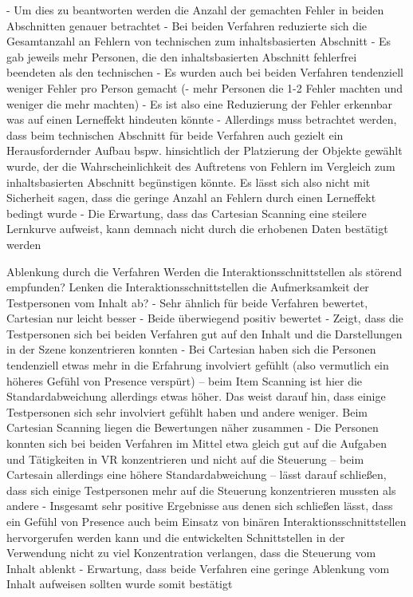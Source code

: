 -	Um dies zu beantworten werden die Anzahl der gemachten Fehler in beiden Abschnitten genauer betrachtet 
-	Bei beiden Verfahren reduzierte sich die Gesamtanzahl an Fehlern von technischen zum inhaltsbasierten Abschnitt 
-	Es gab jeweils mehr Personen, die den inhaltsbasierten Abschnitt fehlerfrei beendeten als den technischen 
-	Es wurden auch bei beiden Verfahren tendenziell weniger Fehler pro Person gemacht (- mehr Personen die 1-2 Fehler machten und weniger die mehr machten)   
-	Es ist also eine Reduzierung der Fehler erkennbar was auf einen Lerneffekt hindeuten könnte 
-	Allerdings muss betrachtet werden, dass beim technischen Abschnitt für beide Verfahren auch gezielt ein Herausfordernder Aufbau bspw. hinsichtlich der Platzierung der Objekte gewählt wurde, der die Wahrscheinlichkeit des Auftretens von Fehlern im Vergleich zum inhaltsbasierten Abschnitt begünstigen könnte. Es lässt sich also nicht mit Sicherheit sagen, dass die geringe Anzahl an Fehlern durch einen Lerneffekt bedingt wurde
-	Die Erwartung, dass das Cartesian Scanning eine steilere Lernkurve aufweist, kann demnach nicht durch die erhobenen Daten bestätigt werden 

Ablenkung durch die Verfahren
Werden die Interaktionsschnittstellen als störend empfunden? Lenken die Interaktionsschnittstellen die Aufmerksamkeit der Testpersonen vom Inhalt ab?
-	Sehr ähnlich für beide Verfahren bewertet, Cartesian nur leicht besser 
-	Beide überwiegend positiv bewertet 
-	Zeigt, dass die Testpersonen sich bei beiden Verfahren gut auf den Inhalt und die Darstellungen in der Szene konzentrieren konnten 
-	Bei Cartesian haben sich die Personen tendenziell etwas mehr in die Erfahrung involviert gefühlt (also vermutlich ein höheres Gefühl von Presence verspürt) – beim Item Scanning ist hier die Standardabweichung allerdings etwas höher. Das weist darauf hin, dass einige Testpersonen sich sehr involviert gefühlt haben und andere weniger. Beim Cartesian Scanning liegen die Bewertungen näher zusammen
-	Die Personen konnten sich bei beiden Verfahren im Mittel etwa gleich gut auf die Aufgaben und Tätigkeiten in VR konzentrieren und nicht auf die Steuerung – beim Cartesain allerdings eine höhere Standardabweichung – lässt darauf schließen, dass sich einige Testpersonen mehr auf die Steuerung konzentrieren mussten als andere 
-	Insgesamt sehr positive Ergebnisse aus denen sich schließen lässt, dass ein Gefühl von Presence auch beim Einsatz von binären Interaktionsschnittstellen hervorgerufen werden kann und die entwickelten Schnittstellen in der Verwendung nicht zu viel Konzentration verlangen, dass die Steuerung vom Inhalt ablenkt 
-	Erwartung, dass beide Verfahren eine geringe Ablenkung vom Inhalt aufweisen sollten wurde somit bestätigt 


